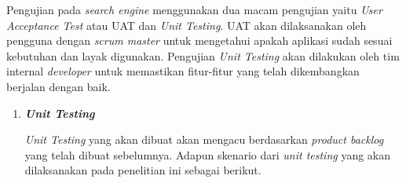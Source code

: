 Pengujian pada \textit{search engine} menggunakan dua macam pengujian yaitu \textit{User Acceptance Test} atau UAT dan \textit{Unit Testing}. UAT akan dilaksanakan oleh pengguna dengan \textit{scrum master} untuk mengetahui apakah aplikasi sudah sesuai kebutuhan dan layak digunakan. Pengujian \textit{Unit Testing} akan dilakukan oleh tim internal \textit{developer} untuk memastikan fitur-fitur yang telah dikembangkan berjalan dengan baik.
\begin{enumerate}[leftmargin=1\parindent]
	\item \textit{\textbf{Unit Testing}}
	
	\textit{Unit Testing} yang akan dibuat akan mengacu berdasarkan \textit{product backlog} yang telah dibuat sebelumnya. Adapun skenario dari \textit{unit testing} yang akan dilaksanakan pada penelitian ini sebagai berikut.
	

\end{enumerate}
